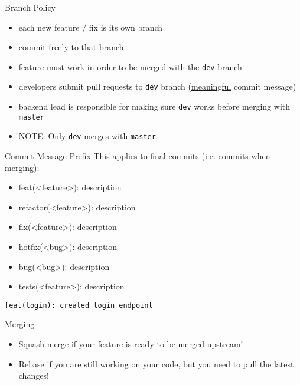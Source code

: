 \documentclass[presentation]{beamer}
\begin{document}
\begin{frame}[label={sec:orga819eb8},fragile]{Branch Policy}
 \begin{itemize}
\item each new feature / fix is its own branch
\item commit freely to that branch
\item feature must work in order to be merged with the \texttt{dev} branch
\item developers submit pull requests to \texttt{dev} branch (\hyperlink{sec:orgf69369e}{meaningful} commit message)
\item backend lead is responsible for making sure \texttt{dev} works before merging with \texttt{master}
\item \alert{NOTE}: Only \texttt{dev} merges with \texttt{master}
\end{itemize}
\end{frame}

\begin{frame}[label={sec:orgf69369e},fragile]{Commit Message Prefix}
 This applies to final commits (i.e. commits when merging):
\begin{itemize}
\item \alert{feat(<feature>)}: description
\item \alert{refactor(<feature>)}: description
\item \alert{fix(<feature>):} description
\item \alert{hotfix(<bug>)}: description
\item \alert{bug(<bug>)}: description
\item \alert{tests(<feature>)}: description
\end{itemize}


\begin{verbatim}
feat(login): created login endpoint
\end{verbatim}
\end{frame}

\begin{frame}[label={sec:org4b7e846}]{Merging}
\begin{itemize}
\item \alert{Squash merge} if your feature is ready to be merged upstream!
\item \alert{Rebase} if you are still working on your code, but you need to pull the latest changes!
\end{itemize}
\end{frame}
\end{document}
